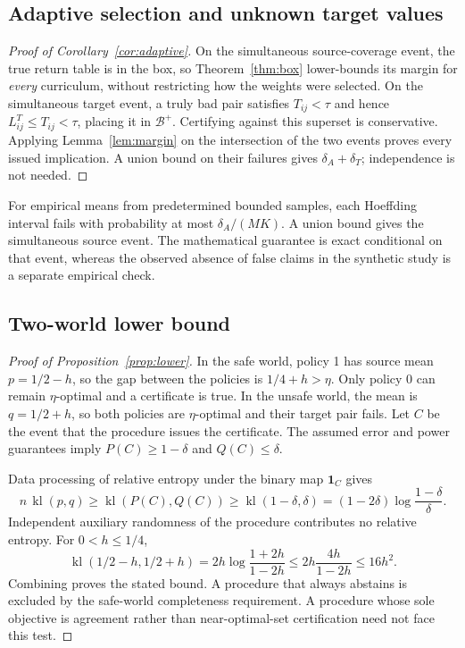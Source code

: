 \documentclass[11pt]{article}
\theoremstyle{definition}\newtheorem{definition}[theorem]{Definition}
\newcommand{\1}{\mathbf{1}}
\newcommand{\bad}{\mathcal B}
\newcommand{\kl}{\operatorname{kl}}
\begin{document}
\subsection{Adaptive selection and unknown target values}
\begin{proof}[Proof of Corollary~\ref{cor:adaptive}]
On the simultaneous source-coverage event, the true return table is in the box, so Theorem~\ref{thm:box} lower-bounds its margin for \emph{every} curriculum, without restricting how the weights were selected. On the simultaneous target event, a truly bad pair satisfies $T_{ij}<\tau$ and hence $L^T_{ij}\leq T_{ij}<\tau$, placing it in $\bad^+$. Certifying against this superset is conservative. Applying Lemma~\ref{lem:margin} on the intersection of the two events proves every issued implication. A union bound on their failures gives $\delta_A+\delta_T$; independence is not needed.
\end{proof}
For empirical means from predetermined bounded samples, each Hoeffding interval fails with probability at most $\delta_A/(MK)$. A union bound gives the simultaneous source event. The mathematical guarantee is exact conditional on that event, whereas the observed absence of false claims in the synthetic study is a separate empirical check.

\subsection{Two-world lower bound}
\begin{proof}[Proof of Proposition~\ref{prop:lower}]
In the safe world, policy 1 has source mean $p=1/2-h$, so the gap between the policies is $1/4+h>\eta$. Only policy 0 can remain $\eta$-optimal and a certificate is true. In the unsafe world, the mean is $q=1/2+h$, so both policies are $\eta$-optimal and their target pair fails. Let $C$ be the event that the procedure issues the certificate. The assumed error and power guarantees imply $P(C)\geq1-\delta$ and $Q(C)\leq\delta$.

Data processing of relative entropy under the binary map $\1_C$ gives
\begin{equation*}
 n\,\kl(p,q)\geq\kl(P(C),Q(C))\geq\kl(1-\delta,\delta)
 =(1-2\delta)\log\frac{1-\delta}{\delta}.
\end{equation*}
Independent auxiliary randomness of the procedure contributes no relative entropy. For $0<h\leq1/4$,
\begin{equation*}
 \kl(1/2-h,1/2+h)=2h\log\frac{1+2h}{1-2h}
 \leq 2h\frac{4h}{1-2h}\leq16h^2.
\end{equation*}
Combining proves the stated bound. A procedure that always abstains is excluded by the safe-world completeness requirement. A procedure whose sole objective is agreement rather than near-optimal-set certification need not face this test.
\end{proof}
\end{document}
